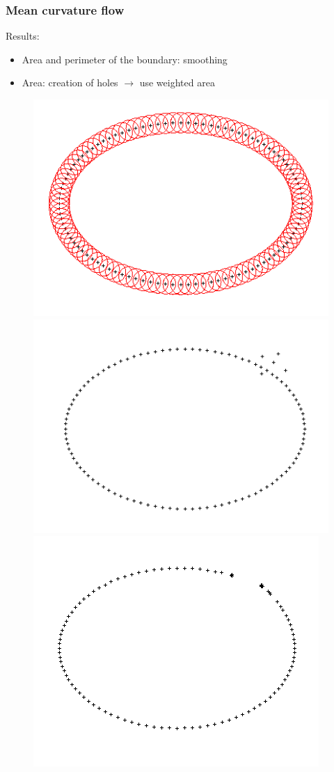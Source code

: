 \documentclass{beamer}
\begin{document}
\begin{frame}
    \frametitle{Mean curvature flow}


    Results:
    \begin{itemize}
        \item Area and perimeter of the boundary: smoothing
        \item Area: creation of holes $ \to $ use weighted area
    \end{itemize}

    \begin{figure}
        \centering
        \includegraphics[scale=0.2]{img/ellipse-balls-15}
        \includegraphics[scale=0.2]{img/ellipse-outliers}
        \includegraphics[scale=0.2]{img/ellipse-outliers-area}

\end{figure}
\end{frame}
\end{document}
